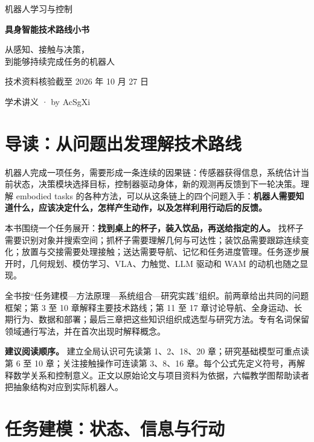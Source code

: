 \documentclass[UTF8,a4paper,11pt,oneside,openany,fontset=none]{ctexbook}
\begin{document}
\frontmatter
\begin{titlepage}
\centering
\vspace*{35mm}
{\large 机器人学习与控制\par}
\vspace{15mm}
{\Huge\bfseries 具身智能技术路线小书\par}
\vspace{12mm}
{\large 从感知、接触与决策，\\[4pt]到能够持续完成任务的机器人\par}
\vfill
{\normalsize 技术资料核验截至 2026 年 10 月 27 日\par}
\vspace{4mm}
{\small 学术讲义 · by AcSgXi\par}
\vspace*{15mm}
\end{titlepage}
{\small\linespread{1.05}\selectfont\tableofcontents}
\chapter*{导读：从问题出发理解技术路线}

机器人完成一项任务，需要形成一条连续的因果链：传感器获得信息，系统估计当前状态，决策模块选择目标，控制器驱动身体，新的观测再反馈到下一轮决策。理解 embodied tasks 的各种方法，可以从这条链上的四个问题入手：\textbf{机器人需要知道什么，应该决定什么，怎样产生动作，以及怎样利用行动后的反馈。}

本书围绕一个任务展开：\textbf{找到桌上的杯子，装入饮品，再送给指定的人。} 找杯子需要识别对象并搜索空间；抓杯子需要理解几何与可达性；装饮品需要跟踪连续变化；放置与交接需要处理接触；送达需要导航、记忆和任务进度管理。任务逐步展开时，几何规划、模仿学习、VLA、力触觉、LLM 驱动和 WAM 的动机也随之显现。

全书按``任务建模---方法原理---系统组合---研究实践''组织。前两章给出共同的问题框架；第 3 至 10 章解释主要技术路线；第 11 至 17 章讨论导航、全身运动、长期行为、数据和部署；最后三章把这些知识组织成选型与研究方法。专有名词保留领域通行写法，并在首次出现时解释概念。

\textbf{建议阅读顺序。} 建立全局认识可先读第 1、2、18、20 章；研究基础模型可重点读第 6 至 10 章；关注接触操作可连读第 3、8、16 章。每个公式先定义符号，再解释数学关系和控制意义。正文以原始论文与项目资料为依据，六幅教学图帮助读者把抽象结构对应到实际机器人。

\mainmatter
\chapter{任务建模：状态、信息与行动}
\end{document}
